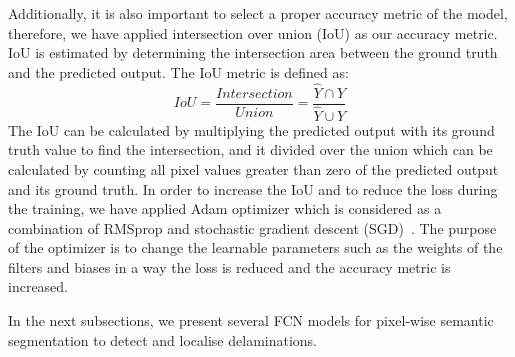 Additionally, it is also important to select a proper accuracy metric of the model, therefore, we have applied intersection over union (IoU) as our accuracy metric. 
IoU is estimated by determining the intersection area between the ground truth and the predicted output.  
The IoU metric is defined as:
\begin{equation}
IoU = \frac{Intersection}{Union} = \frac{\hat{Y} \cap Y}{\hat{Y} \cup Y} 
\label{IoU}
\end{equation}
The IoU can be calculated by multiplying the predicted output with its ground truth value to find the intersection, and it divided over the union which can be calculated by counting all pixel values greater than zero of the predicted output and its ground truth.
In order to increase the IoU and to reduce the loss during the training, we have applied Adam optimizer which is considered as a combination of RMSprop and stochastic gradient descent (SGD)~\cite{Kingma2015}. 
The purpose of the optimizer is to change the learnable parameters such as the weights of the filters and biases in a way the loss is reduced and the accuracy metric is increased.

In the next subsections, we present several FCN models for pixel-wise semantic segmentation to detect and localise delaminations.
